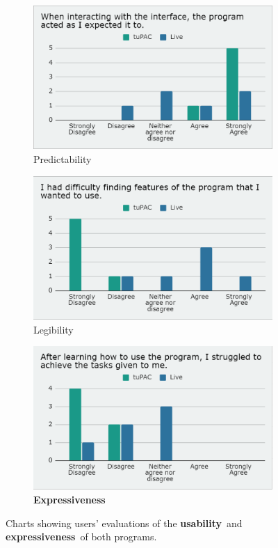 \documentclass[12pt,a4paper,oneside,openright]{report}
\newcommand{\usability}{\textbf{usability}}
\newcommand{\expressiveness}{\textbf{expressiveness}}
\newcommand{\Expressiveness}{\textbf{Expressiveness}}
\begin{document}
\begin{figure}[h!]
\centering
\begin{subfigure}{.33\textwidth}
  \centering
  \includegraphics[width=.9\linewidth]{images/questionnaire/predictability.png}
  \caption{Predictability}
  \label{fig:q_predict}
\end{subfigure}%
\begin{subfigure}{.34\textwidth}
  \centering
  \includegraphics[width=.9\linewidth]{images/questionnaire/legibility.png}
  \caption{Legibility}
  \label{fig:q_leg}
\end{subfigure}%
\begin{subfigure}{.33\textwidth}
    \centering
    \includegraphics[width=.9\linewidth]{images/questionnaire/usability.png}
    \caption{\Expressiveness}
    \label{fig:q_expr}
\end{subfigure}
\caption{Charts showing users' evaluations of the \usability\ and \expressiveness\ of both programs.}
\label{fig:q_3}
\end{figure}
\end{document}
